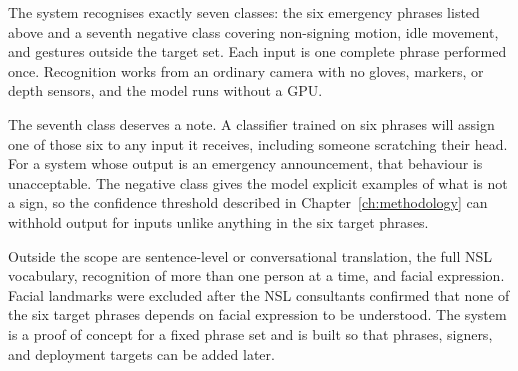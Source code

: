 The system recognises exactly seven classes: the six emergency phrases listed above and a seventh negative class covering non-signing motion, idle movement, and gestures outside the target set. Each input is one complete phrase performed once. Recognition works from an ordinary camera with no gloves, markers, or depth sensors, and the model runs without a GPU.

\noindent The seventh class deserves a note. A classifier trained on six phrases will assign one of those six to any input it receives, including someone scratching their head. For a system whose output is an emergency announcement, that behaviour is unacceptable. The negative class gives the model explicit examples of what is not a sign, so the confidence threshold described in Chapter~\ref{ch:methodology} can withhold output for inputs unlike anything in the six target phrases.

\noindent Outside the scope are sentence-level or conversational translation, the full NSL vocabulary, recognition of more than one person at a time, and facial expression. Facial landmarks were excluded after the NSL consultants confirmed that none of the six target phrases depends on facial expression to be understood. The system is a proof of concept for a fixed phrase set and is built so that phrases, signers, and deployment targets can be added later.
